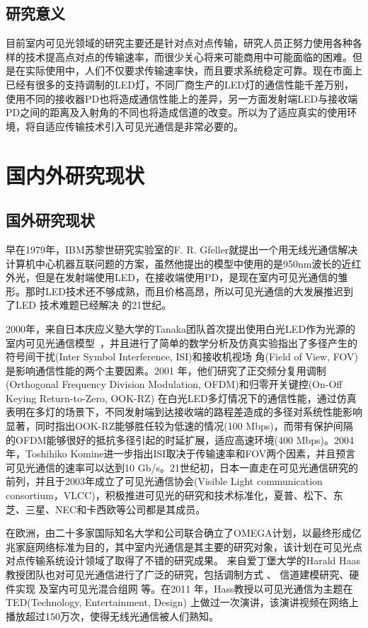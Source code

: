 \subsection{研究意义}
目前室内可见光领域的研究主要还是针对点对点传输，研究人员正努力使用各种各样的技术提高点对点的传输速率，而很少关心将来可能商用中可能面临的困难。但是在实际使用中，人们不仅要求传输速率快，而且要求系统稳定可靠。现在市面上已经有很多的支持调制的LED灯，不同厂商生产的LED灯的通信性能千差万别，使用不同的接收器PD也将造成通信性能上的差异，另一方面发射端LED与接收端PD之间的距离及入射角的不同也将造成信道的改变。所以为了适应真实的使用环境，将自适应传输技术引入可见光通信是非常必要的。

\section{国内外研究现状}\label{sec:stage}
\subsection{国外研究现状}
早在1979年，IBM苏黎世研究实验室的F. R. Gfeller就提出一个用无线光通信解决计算机中心机器互联问题的方案\cite{gfeller1979wireless}，虽然他提出的模型中使用的是950nm波长的近红外光，但是在发射端使用LED，在接收端使用PD，是现在室内可见光通信的雏形。那时LED技术还不够成熟，而且价格高昂，所以可见光通信的大发展推迟到了LED 技术难题已经解决 的21世纪。

2000年，来自日本庆应义塾大学的Tanaka团队首次提出使用白光LED作为光源的室内可见光通信模型\
\cite{tanaka2000wireless}，并且进行了简单的数学分析及仿真实验指出了多径产生的符号间干扰(Inter Symbol Interference, ISI)和接收机视场
角(Field of View, FOV)是影响通信性能的两个主要因素。2001 年，他们研究了正交频分复用调制(Orthogonal Frequency Division Modulation, OFDM)和归零开关键控(On-Off Keying Return-to-Zero, OOK-RZ) 在白光LED多灯情况下的通信性能\cite{tanaka2001indoor}，通过仿真表明在多灯的场景下，不同发射端到达接收端的路程差造成的多径对系统性能影响显著，同时指出OOK-RZ能够胜任较为低速的情况(100 Mbps)，而带有保护间隔的OFDM能够很好的抵抗多径引起的时延扩展，适应高速环境(400 Mbps)。2004年，Toshihiko Komine进一步指出ISI取决于传输速率和FOV两个因素，并且预言可见光通信的速率可以达到10 Gb/s\cite{komine2004fundamental}。21世纪初，日本一直走在可见光通信研究的前列，并且于2003年成立了可见光通信协会(Visible Light
communication consortium，VLCC)，积极推进可见光的研究和技术标准化，夏普、松下、东芝、三星、NEC和卡西欧等公司都是其成员。

在欧洲，由二十多家国际知名大学和公司联合确立了OMEGA计划，以最终形成亿兆家庭网络标准为目的，其中室内光通信是其主要的研究对象，该计划在可见光点对点传输系统设计领域了取得了不错的研究成果\cite{vuvcic2009125,vuvcic2009white,vuvcic2010513,vucic2011803}。 来自爱丁堡大学的Harald Haas教授团队也对可见光通信进行了广泛的研究，包括调制方式
\cite{afgani2006visible,elgala2009indoor,mesleh2010indoor,mesleh2011optical}、 信道建模研究\cite{elgala2009study,elgala2009non}、硬件实现
\cite{stefan2011optical,chun2014demonstration,manousiadis2015demonstration} 及室内可见光混合组网
\cite{wang2015dynamic,stefan2014hybrid,basnayaka2015hybrid} 等。在2011 年，Hass教授以可见光通信为主题在TED(Technology, Entertainment, Design) 上做过一次演讲，该演讲视频在网络上播放超过150万次，使得无线光通信被人们熟知。

